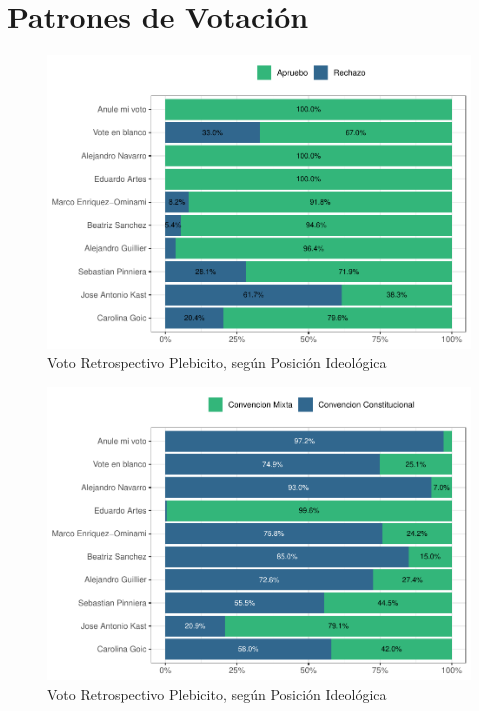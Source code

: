 \documentclass[
  12pt,
]{book}
\begin{document}
\hypertarget{patrones-de-votaciuxf3n}{%
\section{Patrones de Votación}\label{patrones-de-votaciuxf3n}}

\begin{figure}

{\centering \includegraphics{reporte-elsoc_files/figure-latex/presi-voto-c44-1} 

}

\caption{Voto Retrospectivo Plebicito, según Posición Ideológica}\label{fig:presi-voto-c44}
\end{figure}

\begin{figure}

{\centering \includegraphics{reporte-elsoc_files/figure-latex/presi-voto-c45-1} 

}

\caption{Voto Retrospectivo Plebicito, según Posición Ideológica}\label{fig:presi-voto-c45}
\end{figure}
\end{document}
